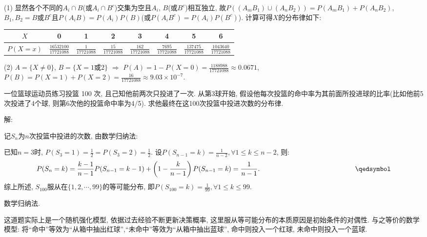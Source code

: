 \documentclass[standard]{ExBook}
\renewenvironment{shaded}{%
  \def\FrameCommand{\fboxsep=\FrameSep \colorbox{shadecolor}}%
  \MakeFramed{\advance\hsize-\width \FrameRestore}%
}{%
  \endMakeFramed
}
\begin{document}
\begin{qitems}
(1) 显然各个不同的$A_{i}\cap B$(或$A_{i}\cap B^{c}$)交集为空且$A_{i}$, $B$(或$B^c$)相互独立, 故$P((A_{m}B_{1})\cup(A_{n}B_{2}))=P(A_{m}B_{1})+P(A_{n}B_{2})$, $B_{1},B_{2}=B\text{或}B^c$且$P(A_{i}B)=P(A_{i})P(B)$(或$P(A_{i}B^{c})=P(A_{i})P(B^{c})$). 计算可得$X$的分布律如下:
\begin{center}
\setlength{\tabcolsep}{13pt}
\begin{tabular}{c|c|c|c|c|c|c|c}
\hline
$X$ & 0 & 1 & 2 & 3 & 4 & 5 & 6 \\
\hline
$P(X=x)$ & $\frac{16532100}{17721088}$ & $\frac{1}{17721088}$ & $\frac{15}{17721088}$ & $\frac{162}{17721088}$ & $\frac{7695}{17721088}$ & $\frac{137475}{17721088}$ & $\frac{1043640}{17721088}$ \\
\hline
\end{tabular}
\end{center}
(2) $A=\{X \neq 0\}$, $B=\{X=1\text{或}2\}$ $\Longrightarrow$ $P(A)=1-P(X=0)=\frac{1188988}{17721088}\approx0.0671$, $P(B)=P(X=1)+P(X=2)=\frac{16}{17721088}\approx9.03\times10^{-7}$.

\vspace{2.5cm-5em}

    \begin{bbox}
    \begin{shaded}
        \qitem
一位篮球运动员练习投篮 100 次, 且己知他前两次只投进了一次. 从第3球开始, 假设他每次投篮的命中率为其前面所投进球的比率(比如他前5次投进了4个球, 则第6次他的投篮命中率为4/5). 求他最终在这100次投篮中投进次数的分布律.
    \end{shaded}
    \end{bbox}

\vspace{\dimexpr2.5cm-5em\relax}

解: 

记$S_n$为$n$次投篮中投进的次数, 由数学归纳法:

已知$n=3$时, $P(S_{3}=1)=\frac{1}{2}=P(S_{3}=2)=\frac{1}{2}$. 设$P(S_{n-1}=k)=\frac{1}{n-2},\forall1 \leq k \leq n-2$, 则: 
$$P(S_{n}=k)=\frac{k-1}{n-1}P(S_{n-1}=k-1)+\left(1-\frac{k}{n-1}\right)P(S_{n-1}=k)=\frac{1}{n-1}. \qquad\qquad\qquad\qquad\qquad\qquad\qquad\qedsymbol$$
综上所述, $S_{100}$服从在$\{1,2,\cdots,99\}$的等可能分布, 即$P(S_{100}=k)=\frac{1}{99},\forall1 \leq k \leq 99.$

\textcolor{themeColor}{\selectfont {} 数学归纳法.}

\textcolor{themeColor}{\selectfont {} 这道题实际上是一个随机强化模型, 依据过去经验不断更新决策概率, 这里服从等可能分布的本质原因是初始条件的对偶性. 与之等价的数学模型: 将``命中''等效为``从箱中抽出红球'',``未命中''等效为``从箱中抽出蓝球'', 命中则投入一个红球, 未命中则投入一个蓝球.}


\end{qitems}
\end{document}
